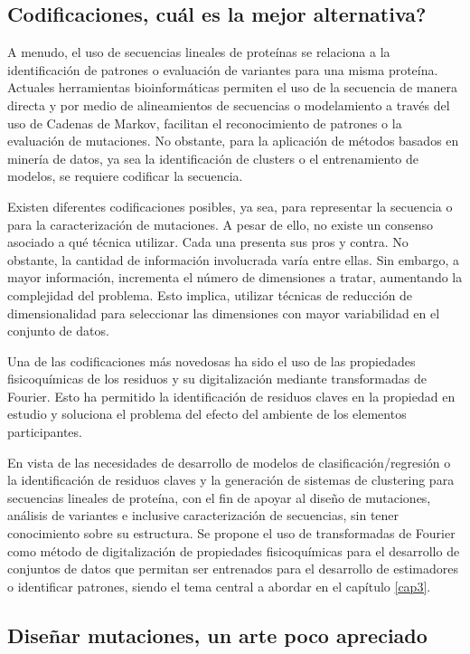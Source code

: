 \subsection{Codificaciones, cuál es la mejor alternativa?}

A menudo, el uso de secuencias lineales de proteínas se relaciona a la identificación de patrones o evaluación de variantes para una misma proteína. Actuales herramientas bioinformáticas permiten el uso de la secuencia de manera directa y por medio de alineamientos de secuencias o modelamiento a través del uso de Cadenas de Markov, facilitan el reconocimiento de patrones o la evaluación de mutaciones. No obstante, para la aplicación de métodos basados en minería de datos, ya sea la identificación de clusters o el entrenamiento de modelos, se requiere codificar la secuencia.

Existen diferentes codificaciones posibles, ya sea, para representar la secuencia o para la caracterización de mutaciones. A pesar de ello, no existe un consenso asociado a qué técnica utilizar. Cada una presenta sus pros y contra. No obstante, la cantidad de información involucrada varía entre ellas. Sin embargo, a mayor información, incrementa el número de dimensiones a tratar, aumentando la complejidad del problema. Esto implica, utilizar técnicas de reducción de dimensionalidad para seleccionar las dimensiones con mayor variabilidad en el conjunto de datos.

Una de las codificaciones más novedosas ha sido el uso de las propiedades fisicoquímicas de los residuos y su digitalización mediante transformadas de Fourier. Esto ha permitido la identificación de residuos claves en la propiedad en estudio y soluciona el problema del efecto del ambiente de los elementos participantes.

En vista de las necesidades de desarrollo de modelos de clasificación/regresión o la identificación de residuos claves y la generación de sistemas de clustering para secuencias lineales de proteína, con el fin de apoyar al diseño de mutaciones, análisis de variantes e inclusive caracterización de secuencias, sin tener conocimiento sobre su estructura. Se propone el uso de transformadas de Fourier como método de digitalización de propiedades fisicoquímicas para el desarrollo de conjuntos de datos que permitan ser entrenados para el desarrollo de estimadores o identificar patrones, siendo el tema central a abordar en el capítulo \ref{cap3}.

\subsection{Diseñar mutaciones, un arte poco apreciado}

